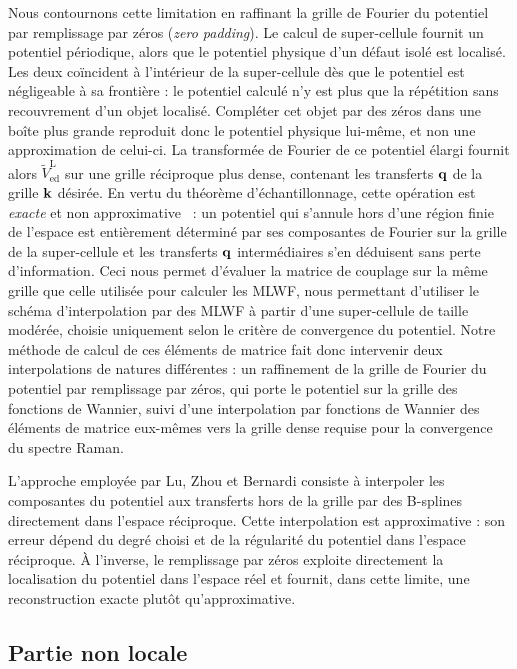 Nous contournons cette limitation en raffinant la grille de Fourier du potentiel par remplissage par zéros (\textit{zero padding}). Le calcul de super-cellule fournit un potentiel périodique, alors que le potentiel physique d'un défaut isolé est localisé. Les deux coïncident à l'intérieur de la super-cellule dès que le potentiel est négligeable à sa frontière : le potentiel calculé n'y est plus que la répétition sans recouvrement d'un objet localisé. Compléter cet objet par des zéros dans une boîte plus grande reproduit donc le potentiel physique lui-même, et non une approximation de celui-ci. La transformée de Fourier de ce potentiel élargi fournit alors $\widetilde{V}_\text{ed}^\text{L}$ sur une grille réciproque plus dense, contenant les transferts $\mathbf{q}$ de la grille $\mathbf{k}$ désirée. En vertu du théorème d'échantillonnage, cette opération est \textit{exacte} et non approximative~\cite{shannonCommunicationPresenceNoise1949} : un potentiel qui s'annule hors d'une région finie de l'espace est entièrement déterminé par ses composantes de Fourier sur la grille de la super-cellule et les transferts $\mathbf{q}$ intermédiaires s'en déduisent sans perte d'information. Ceci nous permet d'évaluer la matrice de couplage sur la même grille que celle utilisée pour calculer les MLWF, nous permettant d'utiliser le schéma d'interpolation par des MLWF à partir d'une super-cellule de taille modérée, choisie uniquement selon le critère de convergence du potentiel. Notre méthode de calcul de ces éléments de matrice fait donc intervenir deux interpolations de natures différentes : un raffinement de la grille de Fourier du potentiel par remplissage par zéros, qui porte le potentiel sur la grille des fonctions de Wannier, suivi d'une interpolation par fonctions de Wannier des éléments de matrice eux-mêmes vers la grille dense requise pour la convergence du spectre Raman.

L'approche employée par Lu, Zhou et Bernardi consiste à interpoler les composantes du potentiel aux transferts hors de la grille par des B-splines directement dans l'espace réciproque. Cette interpolation est approximative : son erreur dépend du degré choisi et de la régularité du potentiel dans l'espace réciproque. À l'inverse, le remplissage par zéros exploite directement la localisation du potentiel dans l'espace réel et fournit, dans cette limite, une reconstruction exacte plutôt qu'approximative.

\subsection{Partie non locale}\label{sec:M_non_local}

